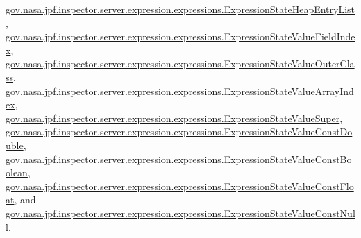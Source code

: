 \hyperlink{classgov_1_1nasa_1_1jpf_1_1inspector_1_1server_1_1expression_1_1expressions_1_1_expression_state_heap_entry_list_a177111768101430f6943fe04956579ca}{gov.\+nasa.\+jpf.\+inspector.\+server.\+expression.\+expressions.\+Expression\+State\+Heap\+Entry\+List}, \hyperlink{classgov_1_1nasa_1_1jpf_1_1inspector_1_1server_1_1expression_1_1expressions_1_1_expression_state_value_field_index_a27a15a9a4ea2cc283d8fe9c00f2a6a6f}{gov.\+nasa.\+jpf.\+inspector.\+server.\+expression.\+expressions.\+Expression\+State\+Value\+Field\+Index}, \hyperlink{classgov_1_1nasa_1_1jpf_1_1inspector_1_1server_1_1expression_1_1expressions_1_1_expression_state_value_outer_class_af25a48b00aad1fa3578e0554d1506c8d}{gov.\+nasa.\+jpf.\+inspector.\+server.\+expression.\+expressions.\+Expression\+State\+Value\+Outer\+Class}, \hyperlink{classgov_1_1nasa_1_1jpf_1_1inspector_1_1server_1_1expression_1_1expressions_1_1_expression_state_value_array_index_ad72611ba9e78fb2d724ad26d437600a9}{gov.\+nasa.\+jpf.\+inspector.\+server.\+expression.\+expressions.\+Expression\+State\+Value\+Array\+Index}, \hyperlink{classgov_1_1nasa_1_1jpf_1_1inspector_1_1server_1_1expression_1_1expressions_1_1_expression_state_value_super_a0e3c6a2aced7b9791f5c0842c734b78d}{gov.\+nasa.\+jpf.\+inspector.\+server.\+expression.\+expressions.\+Expression\+State\+Value\+Super}, \hyperlink{classgov_1_1nasa_1_1jpf_1_1inspector_1_1server_1_1expression_1_1expressions_1_1_expression_state_value_const_double_a42eedfe15044564e744061af712c7848}{gov.\+nasa.\+jpf.\+inspector.\+server.\+expression.\+expressions.\+Expression\+State\+Value\+Const\+Double}, \hyperlink{classgov_1_1nasa_1_1jpf_1_1inspector_1_1server_1_1expression_1_1expressions_1_1_expression_state_value_const_boolean_a1ddaedcf0fb85b579d3764d2154ea945}{gov.\+nasa.\+jpf.\+inspector.\+server.\+expression.\+expressions.\+Expression\+State\+Value\+Const\+Boolean}, \hyperlink{classgov_1_1nasa_1_1jpf_1_1inspector_1_1server_1_1expression_1_1expressions_1_1_expression_state_value_const_float_aedd6f475efc09580ba128165d42760df}{gov.\+nasa.\+jpf.\+inspector.\+server.\+expression.\+expressions.\+Expression\+State\+Value\+Const\+Float}, and \hyperlink{classgov_1_1nasa_1_1jpf_1_1inspector_1_1server_1_1expression_1_1expressions_1_1_expression_state_value_const_null_a6edbf78a9e14eae34d8f7de9d33d0a32}{gov.\+nasa.\+jpf.\+inspector.\+server.\+expression.\+expressions.\+Expression\+State\+Value\+Const\+Null}.

